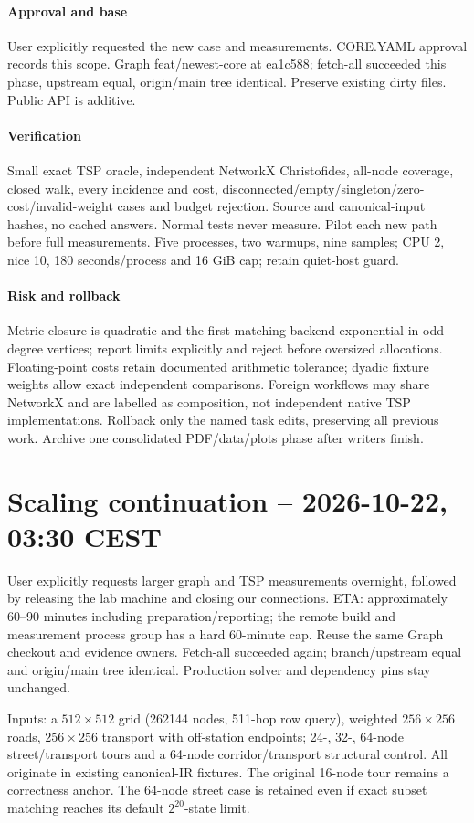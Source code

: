 \documentclass[10pt]{article}
\begin{document}
\paragraph{Approval and base} User explicitly requested the new case and measurements. CORE.YAML approval records this scope. Graph feat/newest-core at ea1c588; fetch-all succeeded this phase, upstream equal, origin/main tree identical. Preserve existing dirty files. Public API is additive.
\paragraph{Verification} Small exact TSP oracle, independent NetworkX Christofides, all-node coverage, closed walk, every incidence and cost, disconnected/empty/singleton/zero-cost/invalid-weight cases and budget rejection. Source and canonical-input hashes, no cached answers. Normal tests never measure. Pilot each new path before full measurements. Five processes, two warmups, nine samples; CPU 2, nice 10, 180 seconds/process and 16 GiB cap; retain quiet-host guard.
\paragraph{Risk and rollback} Metric closure is quadratic and the first matching backend exponential in odd-degree vertices; report limits explicitly and reject before oversized allocations. Floating-point costs retain documented arithmetic tolerance; dyadic fixture weights allow exact independent comparisons. Foreign workflows may share NetworkX and are labelled as composition, not independent native TSP implementations. Rollback only the named task edits, preserving all previous work. Archive one consolidated PDF/data/plots phase after writers finish.

\clearpage
\section*{Scaling continuation -- 2026-10-22, 03:30 CEST}
User explicitly requests larger graph and TSP measurements overnight, followed by releasing the lab machine and closing our connections. ETA: approximately 60--90 minutes including preparation/reporting; the remote build and measurement process group has a hard 60-minute cap. Reuse the same Graph checkout and evidence owners. Fetch-all succeeded again; branch/upstream equal and origin/main tree identical. Production solver and dependency pins stay unchanged.

Inputs: a $512\times512$ grid (262144 nodes, 511-hop row query), weighted $256\times256$ roads, $256\times256$ transport with off-station endpoints; 24-, 32-, 64-node street/transport tours and a 64-node corridor/transport structural control. All originate in existing canonical-IR fixtures. The original 16-node tour remains a correctness anchor. The 64-node street case is retained even if exact subset matching reaches its default $2^{20}$-state limit.
\end{document}
